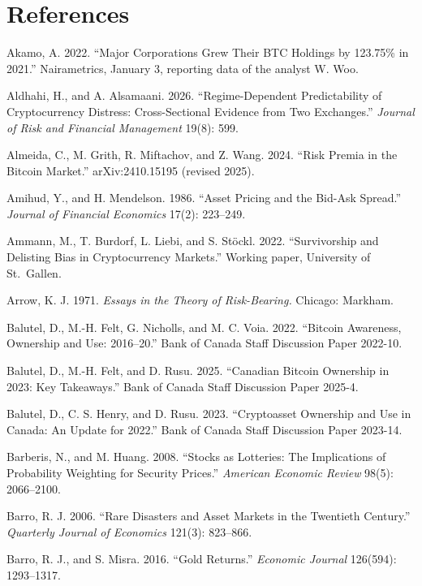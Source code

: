 \documentclass[11pt]{article}
\begin{document}
\section*{References}
\begin{list}{}{\setlength{\itemindent}{-1.5em}\setlength{\leftmargin}{1.5em}\setlength{\itemsep}{2pt}\setlength{\parsep}{0pt}}
\item Akamo, A. 2022. ``Major Corporations Grew Their BTC Holdings by 123.75\% in 2021.'' Nairametrics, January 3, reporting data of the analyst W. Woo.
\item Aldhahi, H., and A. Alsamaani. 2026. ``Regime-Dependent Predictability of Cryptocurrency Distress: Cross-Sectional Evidence from Two Exchanges.'' \emph{Journal of Risk and Financial Management} 19(8): 599.
\item Almeida, C., M. Grith, R. Miftachov, and Z. Wang. 2024. ``Risk Premia in the Bitcoin Market.'' arXiv:2410.15195 (revised 2025).
\item Amihud, Y., and H. Mendelson. 1986. ``Asset Pricing and the Bid-Ask Spread.'' \emph{Journal of Financial Economics} 17(2): 223--249.
\item Ammann, M., T. Burdorf, L. Liebi, and S. St\"ockl. 2022. ``Survivorship and Delisting Bias in Cryptocurrency Markets.'' Working paper, University of St.\ Gallen.
\item Arrow, K. J. 1971. \emph{Essays in the Theory of Risk-Bearing.} Chicago: Markham.
\item Balutel, D., M.-H. Felt, G. Nicholls, and M. C. Voia. 2022. ``Bitcoin Awareness, Ownership and Use: 2016--20.'' Bank of Canada Staff Discussion Paper 2022-10.
\item Balutel, D., M.-H. Felt, and D. Rusu. 2025. ``Canadian Bitcoin Ownership in 2023: Key Takeaways.'' Bank of Canada Staff Discussion Paper 2025-4.
\item Balutel, D., C. S. Henry, and D. Rusu. 2023. ``Cryptoasset Ownership and Use in Canada: An Update for 2022.'' Bank of Canada Staff Discussion Paper 2023-14.
\item Barberis, N., and M. Huang. 2008. ``Stocks as Lotteries: The Implications of Probability Weighting for Security Prices.'' \emph{American Economic Review} 98(5): 2066--2100.
\item Barro, R. J. 2006. ``Rare Disasters and Asset Markets in the Twentieth Century.'' \emph{Quarterly Journal of Economics} 121(3): 823--866.
\item Barro, R. J., and S. Misra. 2016. ``Gold Returns.'' \emph{Economic Journal} 126(594): 1293--1317.

\end{list}
\end{document}
